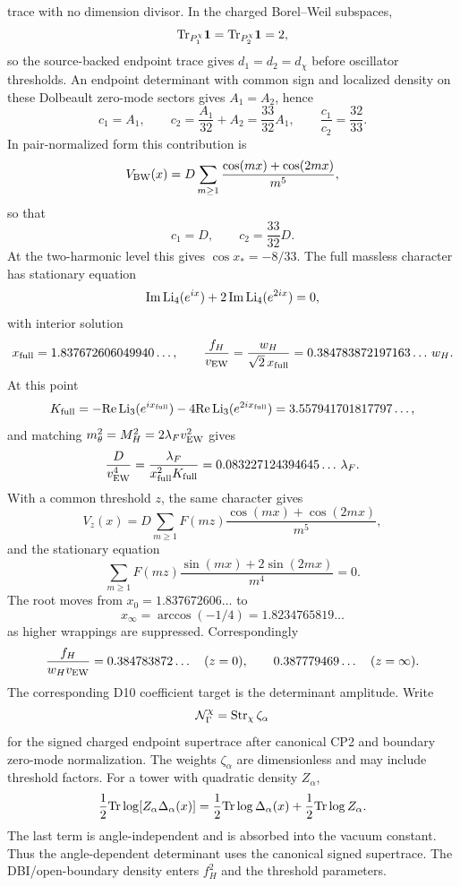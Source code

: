 \documentclass[11pt]{article}
\theoremstyle{definition}
\theoremstyle{remark}
\begin{document}
trace with no dimension divisor.  In the charged Borel--Weil subspaces,
\[
  {\rm Tr}_{P_1^\chi}{\bf 1}
  =
  {\rm Tr}_{P_2^\chi}{\bf 1}
  =
  2,
\]
so the source-backed endpoint trace gives \(d_1=d_2=d_\chi\) before oscillator
thresholds.
An endpoint determinant with common sign and localized density on these
Dolbeault zero-mode sectors gives \(A_1=A_2\), hence
\[
  c_1=A_1,\qquad
  c_2=\frac{A_1}{32}+A_2=\frac{33}{32}A_1,
  \qquad
  \frac{c_1}{c_2}=\frac{32}{33}.
\]
In pair-normalized form this contribution is
\[
  V_{\rm BW}(x)
  =
  D\sum_{m\ge1}\frac{\cos(mx)+\cos(2mx)}{m^5},
\]
so that
\[
  c_1=D,\qquad
  c_2=\frac{33}{32}D .
\]
At the two-harmonic level this gives \(\cos x_*=-8/33\).  The full massless
character has stationary equation
\[
  \operatorname{Im}{\rm Li}_4(e^{ix})
  +
  2\operatorname{Im}{\rm Li}_4(e^{2ix})
  =0,
\]
with interior solution
\[
  x_{\rm full}=1.837672606049940\ldots,
  \qquad
  \frac{f_H}{v_{\rm EW}}
  =
  \frac{w_H}{\sqrt2\,x_{\rm full}}
  =
  0.384783872197163\ldots\,w_H .
\]
At this point
\[
  K_{\rm full}
  =
  -{\rm Re}\,{\rm Li}_3(e^{ix_{\rm full}})
  -
  4{\rm Re}\,{\rm Li}_3(e^{2ix_{\rm full}})
  =
  3.557941701817797\ldots ,
\]
and matching \(m_\theta^2=M_H^2=2\lambda_Fv_{\rm EW}^2\) gives
\[
  \frac{D}{v_{\rm EW}^4}
  =
  \frac{\lambda_F}{x_{\rm full}^2K_{\rm full}}
  =
  0.083227124394645\ldots\,\lambda_F .
\]
With a common threshold \(z\), the same character gives
\[
  V_z(x)
  =
  D\sum_{m\ge1}
  F(mz)\frac{\cos(mx)+\cos(2mx)}{m^5},
\]
and the stationary equation
\[
  \sum_{m\ge1}F(mz)
  \frac{\sin(mx)+2\sin(2mx)}{m^4}
  =0 .
\]
The root moves from \(x_0=1.837672606\ldots\) to
\[
  x_\infty=\arccos(-1/4)=1.8234765819\ldots
\]
as higher wrappings are suppressed.  Correspondingly
\[
  \frac{f_H}{w_Hv_{\rm EW}}
  =
  0.384783872\ldots\quad(z=0),
  \qquad
  0.387779469\ldots\quad(z=\infty).
\]
The corresponding D10 coefficient target is the determinant amplitude.  Write
\[
  {\cal N}_\Gamma^\chi
  =
  {\rm Str}_{\chi}\,\zeta_\alpha
\]
for the signed charged endpoint supertrace after canonical CP2 and boundary
zero-mode normalization.  The weights \(\zeta_\alpha\) are dimensionless and
may include threshold factors.  For a tower with quadratic density \(Z_\alpha\),
\[
  \frac12{\rm Tr}\log[Z_\alpha\Delta_\alpha(x)]
  =
  \frac12{\rm Tr}\log\Delta_\alpha(x)
  +
  \frac12{\rm Tr}\log Z_\alpha .
\]
The last term is angle-independent and is absorbed into the vacuum constant.
Thus the angle-dependent determinant uses the canonical signed supertrace.
The DBI/open-boundary density enters \(f_H^2\) and the threshold parameters.
\end{document}
